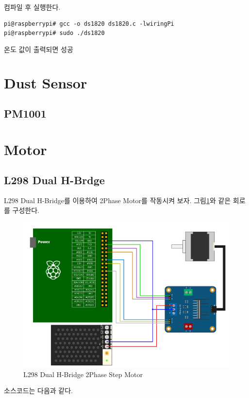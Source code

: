 \documentclass[11pt
  , a4paper
  , article
  , oneside
]{memoir}
\begin{document}
컴파일 후 실행한다.
\begin{lstlisting}[style=termstyle]
pi@raspberrypi# gcc -o ds1820 ds1820.c -lwiringPi
pi@raspberrypi# sudo ./ds1820
\end{lstlisting}
온도 값이 출력되면 성공
\section{Dust Sensor}
\subsection{PM1001}
\section{Motor}
\subsection{L298 Dual H-Brdge}
L298 Dual H-Bridge를 이용하여 2Phase Motor를 작동시켜 보자.
그림\ref{fig:dht11_test}와 같은 회로를 구성한다.
\begin{figure}[!htb]
\centering
\includegraphics[width=1\textwidth]{./images/raspberry/L298Test.png}
\caption{L298 Dual H-Bridge 2Phase Step Motor}
\label{fig:dht11_test}
\end{figure}
소스코드는 다음과 같다.
\end{document}
